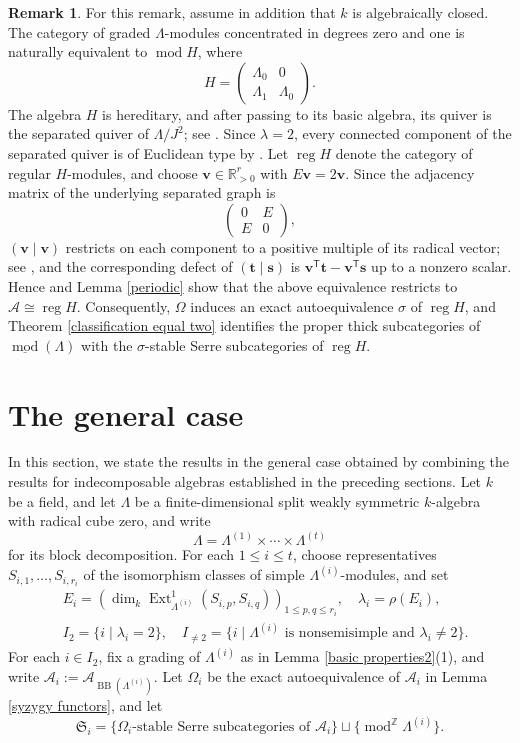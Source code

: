 \documentclass{amsart}
\theoremstyle{definition}
\newtheorem{rem}[thm]{Remark}
\theoremstyle{remark}
\numberwithin{equation}{thm}
\def\A{\mathcal{A}}
\def\BB{\operatorname{BB}}
\def\dim{\operatorname{dim}}
\def\Ext{\operatorname{Ext}}
\def\gmod{\operatorname{mod}^{\mathbb{Z}}\!}
\def\L{\Lambda}
\def\le{\leqslant}
\def\mod{\operatorname{mod}}
\def\reg{\operatorname{reg}}
\def\T{\mathsf{T}}
\def\bfs{\mathbf{s}}
\def\bft{\mathbf{t}}
\def\bfv{\mathbf{v}}
\begin{document}
\begin{rem}\label{hereditary}
For this remark, assume in addition that $k$ is algebraically closed.
The category of graded $\L$-modules concentrated in degrees zero and one is naturally equivalent to $\mod H$, where
$$
H=
\begin{pmatrix}
\L_0&0\\
\L_1&\L_0
\end{pmatrix}.
$$
The algebra $H$ is hereditary, and after passing to its basic algebra, its quiver is the separated quiver of $\L/J^2$; see \cite[Chapter X, Section 2]{ARS}. 
Since $\lambda=2$, every connected component of the separated quiver is of Euclidean type by \cite[Theorem 4.1]{Ben}.
Let $\reg H$ denote the category of regular $H$-modules, and choose $\bfv\in\mathbb R_{>0}^r$ with $E\bfv=2\bfv$.
Since the adjacency matrix of the underlying separated graph is
$$
\begin{pmatrix}
0&E\\
E&0
\end{pmatrix},
$$
$(\bfv\mid\bfv)$ restricts on each component to a positive multiple of its radical vector; see \cite[Theorem 4.2.1]{Kr}, and the corresponding defect of $(\bft\mid\bfs)$ is $\bfv^{\T}\bft-\bfv^{\T}\bfs$ up to a nonzero scalar. Hence \cite[Proposition 5.2.1]{Kr} and Lemma \ref{periodic} show that the above equivalence restricts to $\A\cong\reg H$.
Consequently, $\Omega$ induces an exact autoequivalence $\sigma$ of $\reg H$, and Theorem \ref{classification equal two} identifies the proper thick subcategories of $\underline{\mod}(\L)$ with the $\sigma$-stable Serre subcategories of $\reg H$.
\end{rem}

\section{The general case}

In this section, we state the results in the general case obtained by combining the results for indecomposable algebras established in the preceding sections.
Let $k$ be a field, and let $\L$ be a finite-dimensional split weakly symmetric $k$-algebra with radical cube zero, and write
$$
\L=\L^{(1)}\times\cdots\times\L^{(t)}
$$
for its block decomposition. %
For each $1\le i\le t$, choose representatives $S_{i,1},\ldots,S_{i,r_i}$ of the isomorphism classes of simple $\L^{(i)}$-modules, and set
\begin{align*}
&E_i=\left(\dim_k\Ext_{\L^{(i)}}^1(S_{i,p},S_{i,q})\right)_{1\le p,q\le r_i},\quad \lambda_i=\rho(E_i), \\
&I_2=\{i\mid \lambda_i=2\}, \quad I_{\ne2}=\{i\mid \L^{(i)}\text{ is nonsemisimple and }\lambda_i\ne2\}.
\end{align*}
For each $i\in I_2$, fix a grading of $\L^{(i)}$ as in Lemma \ref{basic properties2}(1), and write $\A_i:=\A_{\BB(\L^{(i)})}$.
Let $\Omega_i$ be the exact autoequivalence of $\A_i$ in Lemma \ref{syzygy functors}, and let
$$
\mathfrak{S}_i=\{\text{$\Omega_i$-stable Serre subcategories of $\A_i$}\}\sqcup\{\gmod\L^{(i)}\}.
$$
\end{document}
